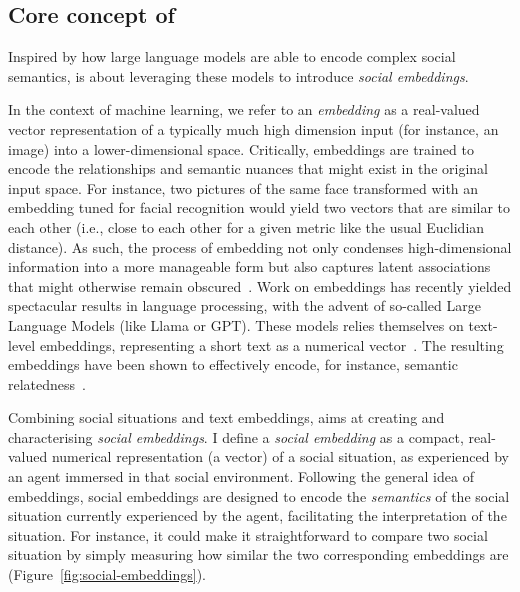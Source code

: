 \subsection{Core concept of \project}

Inspired by how large language models are able to encode complex social
semantics, \project is about leveraging these models to introduce
\emph{social embeddings}.

In the context of machine learning, we refer to an \emph{embedding} as a
real-valued vector representation of a typically much high dimension input (for
instance, an image) into a lower-dimensional space. Critically, embeddings are
trained to encode the relationships and semantic nuances that might exist in the
original input space. For instance, two pictures of the same face transformed
with an embedding tuned for facial recognition would yield two vectors that are
similar to each other (i.e., close to each other for a given metric like the
usual Euclidian distance). As such, the process of embedding not only condenses
high-dimensional information into a more manageable form but also captures
latent associations that might otherwise remain
obscured~\cite{bengio2009learning}. Work on embeddings has recently yielded
spectacular results in language processing, with the advent of so-called Large
Language Models (like Llama or GPT). These models relies themselves on
text-level embeddings, representing a short text as a numerical
vector~\cite{reimers2019sentencebert,muennighoff2022sgpt}. The resulting
embeddings have been shown to effectively encode, for instance, semantic
relatedness~\cite{thakur2021beir}.

Combining social situations and text embeddings, \project aims at creating and
characterising \emph{social embeddings}. I define a \emph{social embedding} as a
compact, real-valued numerical representation (a vector) of a social situation,
as experienced by an agent immersed in that social environment. Following the
general idea of embeddings, social embeddings are designed to encode the
\emph{semantics} of the social situation currently experienced by the agent,
facilitating the interpretation of the situation. For instance, it could make it
straightforward to compare two social situation by simply measuring how similar
the two corresponding embeddings are (Figure~\ref{fig:social-embeddings}).

